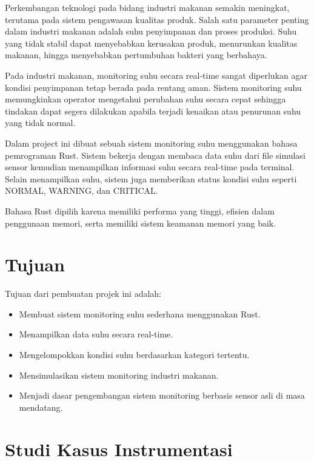 \documentclass[a4paper,12pt]{article}
\begin{document}
Perkembangan teknologi pada bidang industri makanan semakin meningkat, terutama pada sistem pengawasan kualitas produk. Salah satu parameter penting dalam industri makanan adalah suhu penyimpanan dan proses produksi. Suhu yang tidak stabil dapat menyebabkan kerusakan produk, menurunkan kualitas makanan, hingga menyebabkan pertumbuhan bakteri yang berbahaya.

Pada industri makanan, monitoring suhu secara real-time sangat diperlukan agar kondisi penyimpanan tetap berada pada rentang aman. Sistem monitoring suhu memungkinkan operator mengetahui perubahan suhu secara cepat sehingga tindakan dapat segera dilakukan apabila terjadi kenaikan atau penurunan suhu yang tidak normal.

Dalam project ini dibuat sebuah sistem monitoring suhu menggunakan bahasa pemrograman Rust. Sistem bekerja dengan membaca data suhu dari file simulasi sensor kemudian menampilkan informasi suhu secara real-time pada terminal. Selain menampilkan suhu, sistem juga memberikan status kondisi suhu seperti NORMAL, WARNING, dan CRITICAL.

Bahasa Rust dipilih karena memiliki performa yang tinggi, efisien dalam penggunaan memori, serta memiliki sistem keamanan memori yang baik.


\section{Tujuan}

Tujuan dari pembuatan projek ini adalah:

\begin{itemize}
    \item Membuat sistem monitoring suhu sederhana menggunakan Rust.
    \item Menampilkan data suhu secara real-time.
    \item Mengelompokkan kondisi suhu berdasarkan kategori tertentu.
    \item Mensimulasikan sistem monitoring industri makanan.
    \item Menjadi dasar pengembangan sistem monitoring berbasis sensor asli di masa mendatang.
\end{itemize}


\section{Studi Kasus Instrumentasi}
\end{document}
